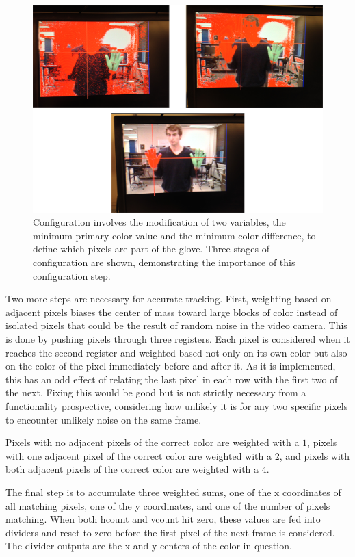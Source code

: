 \begin{figure}[h]
\centering
\includegraphics[width=6.5in]{img/config.png}
\caption{Configuration involves the modification of two variables, the minimum
primary color value and the minimum color difference, to define which pixels are
part of the glove. Three stages of configuration are shown, demonstrating the
importance of this configuration step.}
\label{fig:config}
\end{figure}

Two more steps are necessary for accurate tracking. First, weighting based on
adjacent pixels biases the center of mass toward large blocks of color instead
of isolated pixels that could be the result of random noise in the video camera.
This is done by pushing pixels through three registers. Each pixel is considered
when it reaches the second register and weighted based not only on its own color
but also on the color of the pixel immediately before and after it. As it is
implemented, this has an odd effect of relating the last pixel in each row with
the first two of the next. Fixing this would be good but is not strictly
necessary from a functionality prospective, considering how unlikely it is for
any two specific pixels to encounter unlikely noise on the same frame.

Pixels with no adjacent pixels of the correct color are weighted with a $1$,
pixels with one adjacent pixel of the correct color are weighted with a $2$, and
pixels with both adjacent pixels of the correct color are weighted with a $4$.

The final step is to accumulate three weighted sums, one of the x coordinates of
all matching pixels, one of the y coordinates, and one of the number of pixels
matching. When both hcount and vcount hit zero, these values are fed into
dividers and reset to zero before the first pixel of the next frame is
considered. The divider outputs are the x and y centers of the color in
question.

